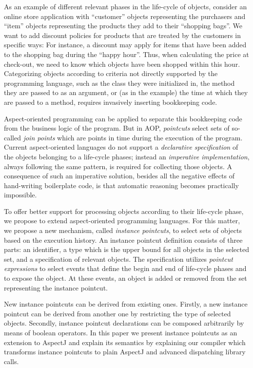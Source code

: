 As an example of different relevant phases in the life-cycle of objects, consider an online store application with ``customer'' objects representing the purchasers and ``item'' objects representing the products they add to their ``shopping bags''. We want to add discount policies for products that are treated by the customers in specific ways: For instance, a discount may apply for items that have been added to the shopping bag during the ``happy hour''. Thus, when calculating the price at check-out, we need to know which objects have been shopped within this hour.
Categorizing objects according to criteria not directly supported by the programming language, such as the class they were initialized in, the method they are passed to as an argument, or (as in the example) the time at which they are passed to a method, requires invasively inserting bookkeeping code.

Aspect-oriented programming can be applied to separate this bookkeeping code from the business logic of the program. But in AOP, \emph{pointcuts} select sets of so-called \emph{join points} which are points in time during the execution of the program. Current aspect-oriented languages do not support a \emph{declarative specification} of the objects belonging to a life-cycle phases; instead an \emph{imperative implementation}, always following the same pattern, is required for collecting those objects.
A consequence of such an imperative solution, besides all the negative effects of hand-writing boilerplate code, is that automatic reasoning becomes practically impossible. 

To offer better support for processing objects according to their life-cycle phase, we propose to extend aspect-oriented programming languages.
For this matter, we propose a new mechanism, called \emph{instance pointcuts}, to select sets of objects based on the execution history.
An instance pointcut definition consists of three parts: an identifier, a type which is the upper bound for all objects in the selected set, and a specification of relevant objects.
The specification utilizes \emph{pointcut expressions} to select events that define the begin and end of life-cycle phases and to expose the object. At these events, an object is added or removed from the set representing the instance pointcut.

New instance pointcuts can be derived from existing ones. Firstly, a new instance pointcut can be derived from another one by restricting the type of selected objects. 
Secondly, instance pointcut declarations can be composed arbitrarily by means of boolean operators. In this paper we present instance pointcuts as an extension to AspectJ \cite{kiczales2001overview} and explain its semantics by explaining our compiler which transforms instance pointcuts to plain AspectJ and advanced dispatching library calls. 


